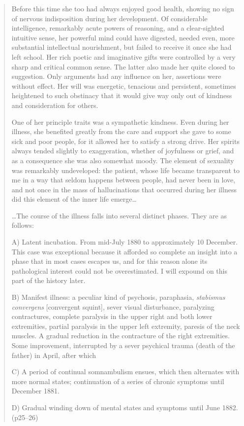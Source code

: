 \begin{quote}

Before this time she too had always enjoyed good health, showing no sign of nervous indisposition during her development. Of considerable intelligence, remarkably acute powers of reasoning, and a clear-sighted intuitive sense, her powerful mind could have digested, needed even, more substantial intellectual nourishment, but failed to receive it once she had left school. Her rich poetic and imaginative gifts were controlled by a very sharp and critical common sense. The latter also made her quite closed to suggestion. Only arguments had any influence on her, assertions were without effect. Her will was energetic, tenacious and persistent, sometimes heightened to such obstinacy that it would give way only out of kindness and consideration for others.

One of her principle traits was a sympathetic kindness. Even during her illness, she benefited greatly from the care and support she gave to some sick and poor people, for it allowed her to satisfy a strong drive. Her spirits always tended slightly to exaggeration, whether of joyfulness or grief, and as a consequence she was also somewhat moody. The element of sexuality was remarkably undeveloped: the patient, whose life became transparent to me in a way that seldom happens between people, had never been in love, and not once in the mass of hallucinations that occurred during her illness did this element of the inner life emerge{\ldots}

{\ldots}The course of the illness falls into several distinct phases. They are as follows:

A) Latent incubation. From mid-July 1880 to approximately 10 December. This case was exceptional because it afforded so complete an insight into a phase that in most cases escapes us, and for this reason alone its pathological interest could not be overestimated. I will expound on this part of the history later.

B) Manifest illness: a peculiar kind of psychosis, paraphasia, \emph{stabismus convergens} [convergent squint], sever visual disturbance, paralyzing contractures, complete paralysis in the upper right and both lower extremities, partial paralysis in the upper left extremity, paresis of the neck muscles. A gradual reduction in the contracture of the right extremities. Some improvement, interrupted by a sever psychical trauma (death of the father) in April, after which

C) A period of continual somnambulism ensues, which then alternates with more normal states; continuation of a series of chronic symptoms until December 1881.

D) Gradual winding down of mental states and symptoms until June 1882. (p25--26)
\end{quote}

